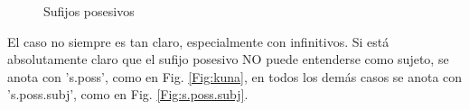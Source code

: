 \documentclass[a4paper,11pt,DIV12]{scrartcl}
\begin{document}
\begin{figure}
\caption{Sufijos posesivos}\label{Fig:s.poss}
\end{figure}

El caso no siempre es tan claro, especialmente con infinitivos. Si est\'a absolutamente claro que el sufijo posesivo NO puede entenderse como sujeto, se anota con 's.poss', como en Fig. \ref{Fig:kuna}, en todos los dem\'as casos se anota con 's.poss.subj', como en Fig. \ref{Fig:s.poss.subj}.\\
\end{document}
